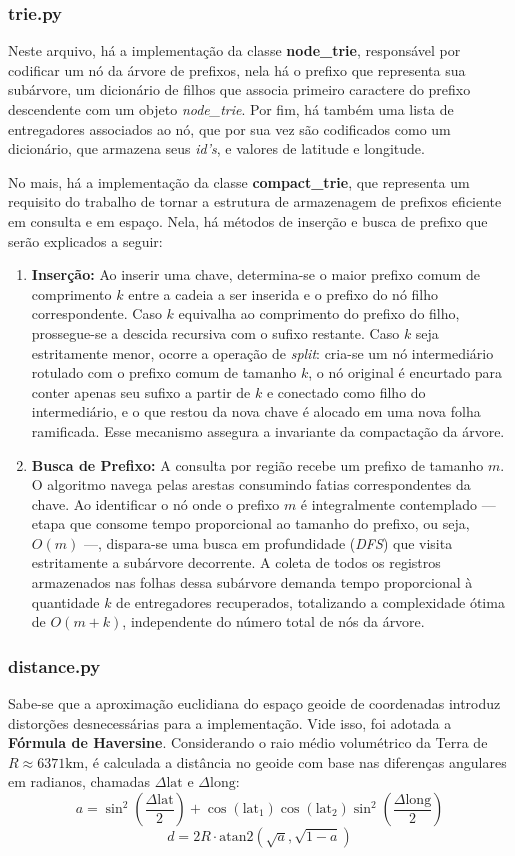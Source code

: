 \documentclass[12pt,a4paper]{article}
\begin{document}
\subsubsection{trie.py}
Neste arquivo, há a implementação da classe \textbf{node\_trie}, responsável por codificar um nó da árvore de prefixos, nela há o prefixo que representa sua subárvore,
um dicionário de filhos que associa primeiro caractere do prefixo descendente com um objeto \textit{node\_trie}. Por fim, há também uma lista de entregadores associados ao nó,
que por sua vez são codificados como um dicionário, que armazena seus \textit{id's}, e valores de latitude e longitude.

No mais, há a implementação da classe \textbf{compact\_trie}, que representa um requisito do trabalho de tornar a estrutura de armazenagem de prefixos eficiente em consulta e em espaço.
Nela, há métodos de inserção e busca de prefixo que serão explicados a seguir:
\begin{enumerate}
  \item \textbf{Inserção:} Ao inserir uma chave, determina-se o maior prefixo comum de comprimento $k$ entre a cadeia a ser inserida e o prefixo do nó filho correspondente.
    Caso $k$ equivalha ao comprimento do prefixo do filho, prossegue-se a descida recursiva com o sufixo restante. Caso $k$ seja estritamente menor, ocorre a operação de \textit{split}:
    cria-se um nó intermediário rotulado com o prefixo comum de tamanho $k$, o nó original é encurtado para conter apenas seu sufixo a partir de $k$ e conectado como filho do intermediário,
    e o que restou da nova chave é alocado em uma nova folha ramificada. Esse mecanismo assegura a invariante da compactação da árvore.
  \item \textbf{Busca de Prefixo:} A consulta por região recebe um prefixo de tamanho $m$. O algoritmo navega pelas arestas consumindo fatias correspondentes da chave.
    Ao identificar o nó onde o prefixo $m$ é integralmente contemplado — etapa que consome tempo proporcional ao tamanho do prefixo, ou seja, $O(m)$ —, dispara-se uma busca em profundidade (\textit{DFS}) que visita estritamente a subárvore decorrente.
    A coleta de todos os registros armazenados nas folhas dessa subárvore demanda tempo proporcional à quantidade $k$ de entregadores recuperados, totalizando a complexidade ótima de $O(m + k)$,
    independente do número total de nós da árvore.
\end{enumerate} 

\subsubsection{distance.py}
Sabe-se que a aproximação euclidiana do espaço geoide de coordenadas introduz distorções desnecessárias para a implementação. Vide isso, foi adotada a \textbf{Fórmula de Haversine}. Considerando o raio médio volumétrico da Terra de $R \approx 6371 \text{km}$, 
é calculada a distância no geoide com base nas diferenças angulares em radianos, chamadas $\Delta\text{lat}$ e $\Delta\text{long}$:
\[
  a = \sin^2\left(\frac{\Delta\text{lat}}{2}\right) + \cos(\text{lat}_1)\cos(\text{lat}_2)\sin^2\left(\frac{\Delta\text{long}}{2}\right)
  \]
  \[
  d = 2 R \cdot \text{atan2}\left(\sqrt{a}, \sqrt{1-a}\right)
  \]
\end{document}
